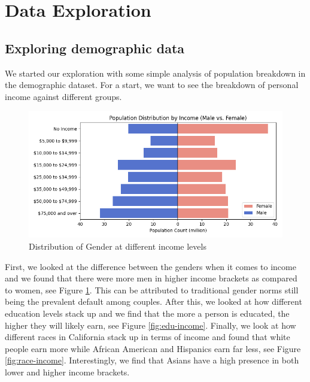 \documentclass[journal]{IEEEtran}
\begin{document}
\section{Data Exploration}
\subsection{Exploring demographic data}

We started our exploration with some simple analysis of population breakdown in
the demographic dataset. For a start, we want to see the breakdown of personal
income against different groups.

\begin{figure}[!htb]
	\centering
	\includegraphics[width=\linewidth]{gender-income.png}
	\caption{Distribution of Gender at different income levels}
	\label{fig:gender-income}
\end{figure}

First, we looked at the difference between the genders when it comes to income
and we found that there were more men in higher income brackets as compared to
women, see Figure \ref{fig:gender-income}. This can be attributed to
traditional gender norms still being the prevalent default among couples. After
this, we looked at how different education levels stack up and we find that the
more a person is educated, the higher they will likely earn, see Figure
\ref{fig:edu-income}. Finally, we look at how different races in California
stack up in terms of income and found that white people earn more while African
American and Hispanics earn far less, see Figure \ref{fig:race-income}.
Interestingly, we find that Asians have a high presence in both lower and
higher income brackets.
\end{document}
